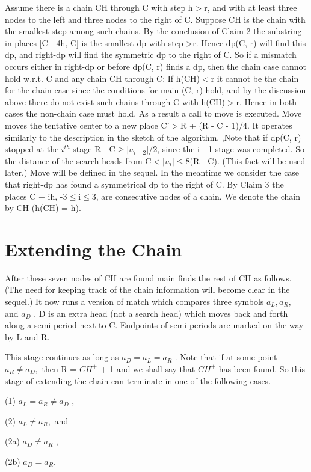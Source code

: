 \documentclass[11pt,a4paper]{report}
\begin{document}
Assume there is a chain CH through C with step h$>$r, and with at least three nodes
to the left and three nodes to the right of C. Suppose CH is the chain with the smallest
step among such chains. By the conclusion of Claim 2 the substring in places [C - 4h, C]
is the smallest dp with step >r. Hence dp(C, r) will find this dp, and right-dp will find
the symmetric dp to the right of C. So if a mismatch occurs either in right-dp or before
dp(C, r) finds a dp, then the chain case cannot hold w.r.t. C and any chain CH through
C: If h(CH)$<$r it cannot be the chain for the chain case since the conditions for main
(C, r) hold, and by the discussion above there do not exist such chains through C with
h(CH)$>$r. Hence in both cases the non-chain case must hold. As a result a call to move
is executed. Move moves the tentative center to a new place C’$>$R + (R - C - 1)/4.
It operates similarly to the description in the sketch of the algorithm. ,Note that if dp(C, r)
stopped at the $i^{th}$ stage R - C$\geq  | u_{i-2}| $/2, since the i - 1 stage was completed. So the
distance of the search heads from C$<| u_i |\leq$8(R - C). (This fact will be used later.)
Move will be defined in the sequel. In the meantime we consider the case that right-dp
has found a symmetrical dp to the right of C. By Claim 3 the places C + ih, -3$\leq$i$\leq$3,
are consecutive nodes of a chain. We denote the chain by CH (h(CH) = h). 




\chapter{Extending the Chain}


After these seven nodes of CH are found main finds the rest of CH as follows. (The
need for keeping track of the chain information will become clear in the sequel.) It now
runs a version of match which compares three symbols $a_L , a_R ,$ and $a_D$ . D is an extra
head (not a search head) which moves back and forth along a semi-period next to C.
Endpoints of semi-periods are marked on the way by L and R.

This stage continues as long as $a_D = a_L = a_R$ . Note that if at some point $a_R \neq a_D ,$
then R = $CH^{+}$ + 1 and we shall say that $CH^{+}$ has been found. So this stage of extending
the chain can terminate in one of the following cases.

(1) $a_L = a_R \neq a_D$ ,

(2) $a_L\neq a_R ,$ and
\begin{myindentpar}{4em}

(2a) $a_D \neq a_R$ ,

(2b) $a_D = a_R$.
\end{myindentpar}
\end{document}
